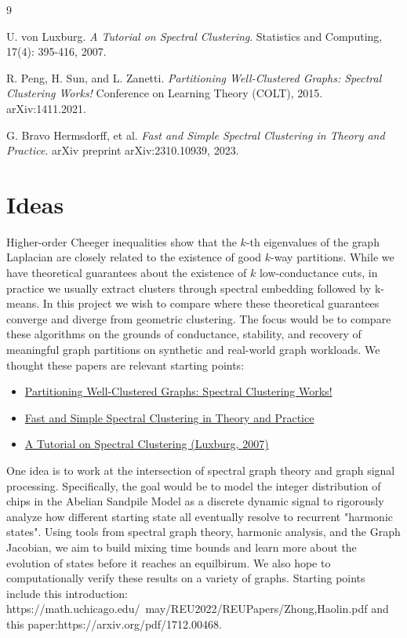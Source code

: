 \documentclass{article}
\theoremstyle{definition}
\theoremstyle{remark}
\begin{document}
\vspace{1em}
\begin{thebibliography}{9}

U. von Luxburg.
\textit{A Tutorial on Spectral Clustering}.
Statistics and Computing, 17(4): 395-416, 2007.

R. Peng, H. Sun, and L. Zanetti.
\textit{Partitioning Well-Clustered Graphs: Spectral Clustering Works!}
Conference on Learning Theory (COLT), 2015. arXiv:1411.2021.

G. Bravo Hermsdorff, et al.
\textit{Fast and Simple Spectral Clustering in Theory and Practice}.
arXiv preprint arXiv:2310.10939, 2023.

\end{thebibliography}

\section{Ideas}

Higher-order Cheeger inequalities show that the $k$-th eigenvalues of the graph Laplacian are closely related to the existence of good $k$-way partitions. While we have theoretical guarantees about the existence of \(k\) low-conductance cuts, in practice we usually extract clusters through spectral embedding followed by k-means. In this project we wish to compare where these theoretical guarantees converge and diverge from geometric clustering. The focus would be to compare these algorithms on the grounds of conductance, stability, and recovery of meaningful graph partitions on synthetic and real-world graph workloads. We thought these papers are relevant starting points: 
\begin{itemize}
    \item \href{https://arxiv.org/abs/1411.2021}{Partitioning Well-Clustered Graphs: Spectral Clustering Works!}
    \item \href{https://arxiv.org/abs/2310.10939}{Fast and Simple Spectral Clustering in Theory and Practice}
    \item \href{https://is.mpg.de/publications/4488}{A Tutorial on Spectral Clustering (Luxburg, 2007)}
\end{itemize}

One idea is to work at the intersection of spectral graph theory and graph signal processing. Specifically, the goal would be to model the integer distribution of chips in the Abelian Sandpile Model as a discrete dynamic signal to rigorously analyze how different starting state all eventually resolve to recurrent "harmonic states". Using tools from spectral graph theory, harmonic analysis, and the Graph Jacobian, we aim to build mixing time bounds and learn more about the evolution of states before it reaches an equilbirum. We also hope to computationally verify these results on a variety of graphs. Starting points include this introduction: https://math.uchicago.edu/~may/REU2022/REUPapers/Zhong,Haolin.pdf and this paper:https://arxiv.org/pdf/1712.00468.
\end{document}
